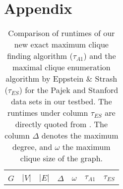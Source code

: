 \section*{Appendix}
\label{sec:appendix}

\begin{table}[!hbt]
\centering
\caption{Comparison of runtimes of our new exact maximum clique finding algorithm ($\tau_{A1}$) and the maximal clique enumeration algorithm by Eppstein \& Strash \cite{sea} ($\tau_{ES}$) for the Pajek and Stanford data sets in our testbed. The runtimes under column $\tau_{ES}$ are directly quoted from \cite{sea}.
The column $\Delta$ denotes the maximum degree, and $\omega$ the maximum clique size of the graph.}
\label{tab:pajek_stanford-es}
\begin{tabular}{lrrrr|rr}
\toprule\toprule
	&		&		&		&		&		&		\\
$G$	&	$\left|V\right|$	&	$\left|E\right|$	&	$\Delta$	&	$\omega$	&	$\tau_{A1}$	&	$\tau_{ES}$ \cite{sea}  	\\ \hline \hline

\end{tabular}
\end{table}
